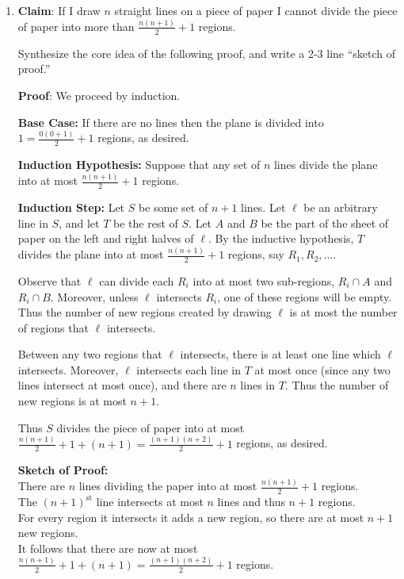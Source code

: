 \documentclass[11pt,fleqn]{article}
\begin{document}
\begin{enumerate}
\newpage
\item 
\textbf{Claim}: If I draw $n$ straight lines on a piece of paper
I cannot divide the piece of paper
into more than $\frac {n(n+1)}{2} + 1$ regions.

Synthesize the core idea of the following proof, and write a 2-3 line ``sketch of proof.''

\textbf{Proof}: We proceed by induction. 

{\bf Base Case:} If there are no lines then the plane is divided into $1 = \frac {0(0+1)}2 + 1$ regions, as desired. 

{\bf Induction Hypothesis:} Suppose that any set of $n$ lines divide the plane into at most $\frac {n(n+1)}2 + 1$ regions.

{\bf Induction Step:} Let $S$ be some set of $n+1$ lines.
Let $\ell$ be an arbitrary line in $S$, 
and let $T$ be the rest of $S$.
Let $A$ and $B$ be the part of the sheet of paper
on the left and right halves of $\ell$.
By the inductive hypothesis, $T$ divides the plane into at most $\frac {n(n+1)}2 + 1$ regions,
say $R_1, R_2, \ldots$.

Observe that $\ell$ can divide each $R_i$ into at most two sub-regions,
$R_i \cap A$ and $R_i \cap B$.
Moreover, unless $\ell$ intersects $R_i$, one of these regions will be empty.
Thus the number of new regions created by drawing $\ell$
is at most the number of regions that $\ell$ intersects.

Between any two regions that $\ell$ intersects, there is at least one
line which $\ell$ intersects.
Moreover, $\ell$ intersects each line in $T$ at most once
(since any two lines intersect at most once), and there are $n$
lines in $T$.
Thus the number of new regions is at most $n+1$.

Thus $S$ divides the piece of paper into at most 
$\frac {n(n+1)}2 + 1 + (n+1) = \frac {(n+1)(n+2)}2 + 1$ regions, as desired.

{\bf Sketch of Proof:} \\
    There are $n$ lines dividing the paper into at most $\frac{n(n+1)}{2} + 1$ regions. \\
    The $(n+1)^{\text{st}}$ line intersects at most $n$ lines and thus $n+1$ regions. \\
    For every region it intersects it adds a new region, so there are at most $n+1$ new regions. \\
    It follows that there are now at most $\frac{n(n+1)}{2}+1 + (n+1) = \frac{(n+1)(n+2)}{2}+1$ regions.


\end{enumerate}
\end{document}
